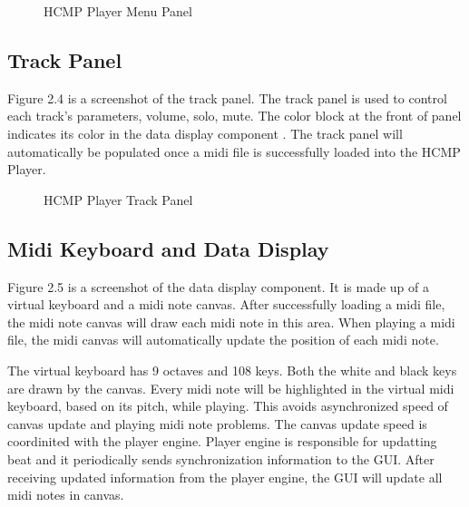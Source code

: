 \begin{figure}[H]
\caption{HCMP Player Menu Panel}
\label{fig:speciation}
\end{figure}

\subsection{Track Panel}

Figure 2.4 is a screenshot of the track panel. The track panel is used to 
control each track's parameters, volume, solo, mute. The color
block at the front of panel indicates its color in the data display component . The 
track panel will automatically be populated once a midi file is successfully 
loaded into the HCMP Player.
\begin{figure}[H]
\caption{HCMP Player Track Panel}
\label{fig:speciation}
\end{figure}

\subsection{Midi Keyboard and Data Display}
Figure 2.5 is a screenshot of the data display component. It is made up of a virtual  
keyboard and a midi note canvas. After successfully loading a midi file, the midi 
note canvas will 
draw each midi note in this area. When playing a midi file, the midi canvas will 
automatically update the position of each midi note. 

The virtual keyboard has 9 octaves and 108 keys. Both the white and black keys 
are drawn by the canvas. Every midi note will be highlighted in the 
virtual midi keyboard, based on its pitch, while playing. This avoids asynchronized speed 
of canvas update and playing midi note problems. The canvas update speed is 
coordinited with the player engine. Player engine is responsible for updatting beat and it 
periodically sends synchronization information to the GUI. After receiving updated 
information from the player engine, the GUI will update all midi notes in canvas.

